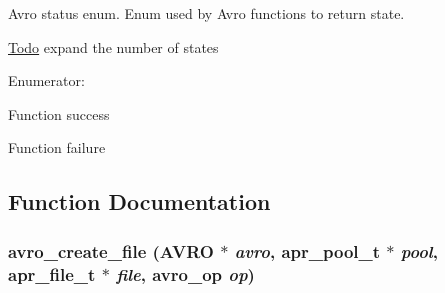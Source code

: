 Avro status enum. Enum used by Avro functions to return state. \begin{Desc}
\item[\hyperlink{todo__todo000001}{Todo}]expand the number of states \end{Desc}
\begin{Desc}
\item[Enumerator: ]\par
\begin{description}
\item[{\em 
\hypertarget{group___handle___routines_gg4271ca78aabaaad628d7b632aa5a1499c6fd26496969f7d61ece32e42612675f}{
AVRO\_\-OK}
\label{group___handle___routines_gg4271ca78aabaaad628d7b632aa5a1499c6fd26496969f7d61ece32e42612675f}
}]Function success \item[{\em 
\hypertarget{group___handle___routines_gg4271ca78aabaaad628d7b632aa5a1499c0a18cacdcccfd794fc1c49b3e98c5bb}{
AVRO\_\-FAILURE}
\label{group___handle___routines_gg4271ca78aabaaad628d7b632aa5a1499c0a18cacdcccfd794fc1c49b3e98c5bb}
}]Function failure \end{description}
\end{Desc}



\subsection{Function Documentation}
\hypertarget{group___handle___routines_g072028012d958aec05067e1c1e04ee0e}{
\subsubsection[{avro\_\-create\_\-file}]{ avro\_\-create\_\-file ({\bf AVRO} $\ast$ {\em avro}, \/  apr\_\-pool\_\-t $\ast$ {\em pool}, \/  apr\_\-file\_\-t $\ast$ {\em file}, \/  {\bf avro\_\-op} {\em op})}}
\label{group___handle___routines_g072028012d958aec05067e1c1e04ee0e}


